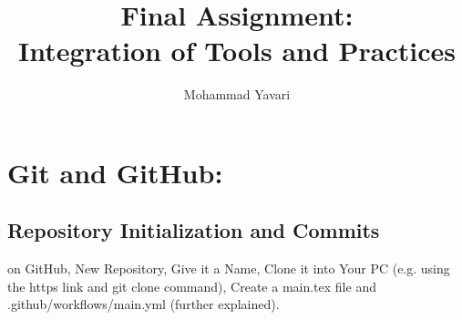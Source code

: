 \documentclass[titlepage]{article}
\title{Final Assignment:\\Integration of Tools and Practices}
\author{Mohammad Yavari}
\begin{document}
\maketitle
\tableofcontents
\section{Git and GitHub:}
\subsection{Repository Initialization and Commits}
on GitHub, New Repository, Give it a Name, Clone it into Your PC (e.g. using the https link and git clone command), Create a main.tex file and .github/workflows/main.yml (further explained).
\end{document}

